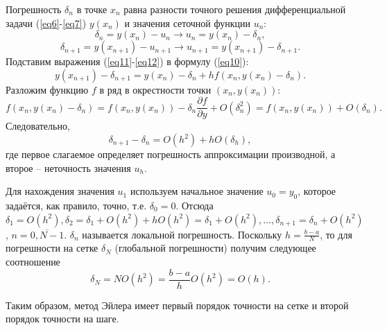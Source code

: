 \documentclass[
11pt,
master, %
subf, %
href, %
colorlinks=true, %
times, %
]{disser}
\begin{document}
Погрешность $\delta_n$ в точке $x_n$ равна разности точного решения дифференциальной задачи (\ref{eq6}-\ref{eq7}) $y(x_n)$ и значения сеточной функции $u_n$:
\begin{equation}\label{eq11}
  \delta_n = y(x_n) - u_n \rightarrow u_n = y(x_n) - \delta_n,
\end{equation}
\begin{equation}\label{eq12}
  \delta_{n+1} = y(x_{n+1}) - u_{n+1} \rightarrow u_{n+1} = y(x_{n+1}) - \delta_{n+1}.
\end{equation}
Подставим выражения (\ref{eq11}-\ref{eq12}) в формулу (\ref{eq10}):
\begin{equation}\label{eq13}
  y(x_{n+1}) - \delta_{n+1} = y(x_n) - \delta_n + hf(x_n,y(x_n) - \delta_n).
\end{equation}
Разложим функцию $f$ в ряд в окрестности точки $(x_n,y(x_n))$:
$$f(x_n,y(x_n)-\delta_n) = f(x_n,y(x_n)) - \delta_n \frac{\partial f}{\partial y} + O(\delta_n^2) = f(x_n,y(x_n)) + O(\delta_n).$$
Следовательно,
$$\delta_{n+1} - \delta_n = O(h^2) + h O(\delta_h),$$
где первое слагаемое определяет погрешность аппроксимации производной, а второе -- неточность значения $u_h$.

Для нахождения значения $u_1$ используем начальное значение $u_0 = y_0$, которое задаётся, как правило, точно, т.е. $\delta_0 = 0$. Отсюда $\delta_1 = O(h^2), \delta_2 = \delta_1 + O(h^2) + hO(h^2) = \delta_1 + O(h^2),\ldots, \delta_{n+1} = \delta_n + O(h^2)$, $n = \overline{0,N-1}$. $\delta_n$ называется локальной погрешность. Поскольку $h=\frac{b-a}{N}$, то для погрешности на сетке $\delta_N$ (глобальной погрешности) получим следующее соотношение
$$\delta_N = NO(h^2) = \frac{b-a}{h} O(h^2) = O(h).$$

Таким образом, метод Эйлера имеет первый порядок точности на сетке и второй порядок точности на шаге.
\end{document}
